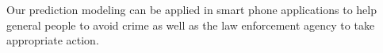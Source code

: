 \documentclass{sig-alternate}
\begin{document}
Our prediction modeling can be applied in smart phone applications
to help general people to avoid crime
as well as the law enforcement agency to take appropriate action.


%
%
\balance
\end{document}
